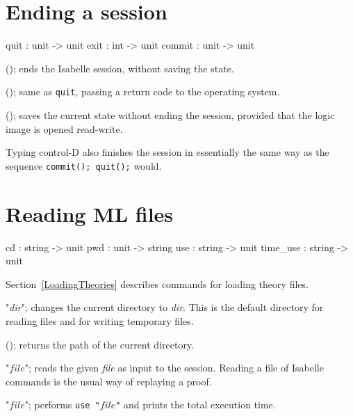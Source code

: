 \section{Ending a session}
\begin{ttbox} 
quit    : unit -> unit
exit    : int -> unit
commit  : unit -> unit
\end{ttbox}
\begin{ttdescription}
\item[\ttindexbold{quit}();] ends the Isabelle session, without saving
  the state.

\item[\ttindexbold{exit}();] same as {\tt quit}, passing a return code
  to the operating system.

\item[\ttindexbold{commit}();] saves the current state without ending
  the session, provided that the logic image is opened read-write.
\end{ttdescription}

Typing control-D also finishes the session in essentially the same way
as the sequence {\tt commit(); quit();} would.


\section{Reading ML files}
\begin{ttbox} 
cd              : string -> unit
pwd             : unit -> string
use             : string -> unit
time_use        : string -> unit
\end{ttbox}
Section~\ref{LoadingTheories} describes commands for loading theory files.
\begin{ttdescription}
\item[\ttindexbold{cd} "{\it dir}";]
  changes the current directory to {\it dir}.  This is the default directory
  for reading files and for writing temporary files.

\item[\ttindexbold{pwd}();] returns the path of the current directory.

\item[\ttindexbold{use} "$file$";]  
reads the given {\it file} as input to the \ML{} session.  Reading a file
of Isabelle commands is the usual way of replaying a proof.

\item[\ttindexbold{time_use} "$file$";]  
performs {\tt use~"$file$"} and prints the total execution time.
\end{ttdescription}


